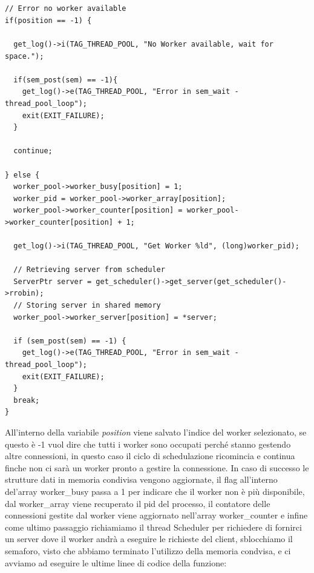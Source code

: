 \documentclass[italian]{tktltiki2}
\begin{document}
\\
\\
\begin{lstlisting}
// Error no worker available
if(position == -1) {
  
  get_log()->i(TAG_THREAD_POOL, "No Worker available, wait for space.");

  if(sem_post(sem) == -1){
    get_log()->e(TAG_THREAD_POOL, "Error in sem_wait - thread_pool_loop");
    exit(EXIT_FAILURE);
  }

  continue;

} else {
  worker_pool->worker_busy[position] = 1;
  worker_pid = worker_pool->worker_array[position];
  worker_pool->worker_counter[position] = worker_pool->worker_counter[position] + 1;
  
  get_log()->i(TAG_THREAD_POOL, "Get Worker %ld", (long)worker_pid);

  // Retrieving server from scheduler
  ServerPtr server = get_scheduler()->get_server(get_scheduler()->rrobin);
  // Storing server in shared memory
  worker_pool->worker_server[position] = *server;
  
  if (sem_post(sem) == -1) {
    get_log()->e(TAG_THREAD_POOL, "Error in sem_wait - thread_pool_loop");
    exit(EXIT_FAILURE);
  }
  break;
}
\end{lstlisting}
All'interno della variabile \emph{position} viene salvato l'indice del worker selezionato, se questo è -1 vuol dire che tutti i worker sono occupati perché stanno gestendo altre connessioni, in questo caso il ciclo di schedulazione ricomincia e continua finche non ci sarà un worker pronto a gestire la connessione. In caso di successo le strutture dati in memoria condivisa vengono aggiornate, il flag all'interno del'array worker\_busy passa a 1 per indicare che il worker non è più disponibile, dal worker\_array viene recuperato il pid del processo, il contatore delle connessioni gestite dal worker viene aggiornato nell'array worker\_counter e infine come ultimo passaggio richiamiamo il thread Scheduler per richiedere di fornirci un server dove il worker andrà a eseguire le richieste del client, sblocchiamo il semaforo, visto che abbiamo terminato l'utilizzo della memoria condvisa, e ci avviamo ad eseguire le ultime linee di codice della funzione:
\end{document}
